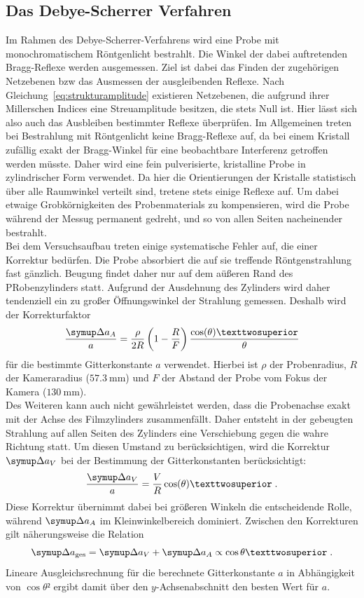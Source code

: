 \subsection{Das Debye-Scherrer Verfahren}
%
Im Rahmen des Debye-Scherrer-Verfahrens wird eine Probe mit monochromatischem Röntgenlicht bestrahlt. Die Winkel der dabei auftretenden
Bragg-Reflexe werden ausgemessen. Ziel ist dabei das Finden der zugehörigen Netzebenen bzw das Ausmessen der ausgleibenden Reflexe. Nach
Gleichung~\eqref{eq:strukturamplitude} existieren Netzebenen, die aufgrund ihrer Millerschen Indices eine Streuamplitude besitzen, die
stets Null ist. Hier lässt sich also auch das Ausbleiben bestimmter Reflexe überprüfen. Im Allgemeinen treten bei Bestrahlung mit
Röntgenlicht keine Bragg-Reflexe auf, da bei einem Kristall zufällig exakt der Bragg-Winkel für eine beobachtbare Interferenz getroffen
werden müsste. Daher wird eine fein pulverisierte, kristalline Probe in zylindrischer Form verwendet. Da hier die Orientierungen der
Kristalle statistisch über alle Raumwinkel verteilt sind, tretene stets einige Reflexe auf. Um dabei etwaige Grobkörnigkeiten des
Probenmaterials zu kompensieren, wird die Probe während der Messug permanent gedreht, und so von allen Seiten nacheinender bestrahlt.\\
Bei dem Versuchsaufbau treten einige systematische Fehler auf, die einer Korrektur bedürfen. Die Probe absorbiert die auf sie treffende
Röntgenstrahlung fast gänzlich. Beugung findet daher nur auf dem aüßeren Rand des PRobenzylinders statt. Aufgrund der Ausdehnung des
Zylinders wird daher tendenziell ein zu großer Öffnungswinkel der Strahlung gemessen. Deshalb wird der Korrekturfaktor
%
\begin{equation}
 \frac{\upD a_A}{a}=\frac{\rho}{2R}\left(1-\frac{R}{F}\right)\frac{\cos(\theta)²}{\theta}
\end{equation}
%
für die bestimmte Gitterkonstante $a$ verwendet. Hierbei ist $\rho$ der Probenradius, $R$ der Kameraradius ($\SI{57,3}{\milli\meter}$)
und $F$ der Abstand der Probe vom Fokus der Kamera ($\SI{130}{\milli\meter}$).\\
Des Weiteren kann auch nicht gewährleistet werden, dass die Probenachse exakt mit der Achse des Filmzylinders zusammenfällt. Daher
entsteht in der gebeugten Strahlung auf allen Seiten des Zylinders eine Verschiebung gegen die wahre Richtung statt. Um diesen
Umstand zu berücksichtigen, wird die Korrektur $\upD a_V$ bei der Bestimmung der Gitterkonstanten berücksichtigt:
%
\begin{equation}
  \frac{\upD a_V}{a}=\frac{V}{R}\cos(\theta)² \; .
\end{equation}
%
Diese Korrektur übernimmt dabei bei größeren Winkeln die entscheidende Rolle, während $\upD a_A$ im Kleinwinkelbereich dominiert.
Zwischen den Korrekturen gilt näherungsweise die Relation
%
\begin{equation}
  \upD a_\text{ges}=\upD a_V+\upD a_A\propto\cos{\theta}² \; .
\end{equation}
%
Lineare Ausgleichsrechnung für die berechnete Gitterkonstante $a$ in Abhängigkeit von $\cos{\theta}²$ ergibt damit über den
$y$-Achsenabschnitt den besten Wert für $a$.
